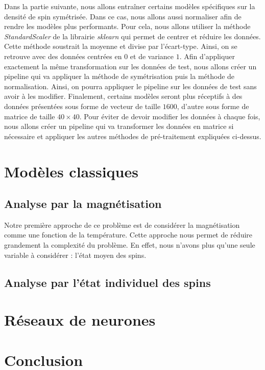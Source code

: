 \documentclass[11pt]{scrartcl} %
\begin{document}
Dans la partie suivante, nous allons entraîner certains modèles spécifiques sur la densité de spin symétrisée. Dans ce cas, nous allons aussi normaliser afin de rendre les modèles plus performants.
Pour cela, nous allons utiliser la méthode \textit{StandardScaler} de la librairie \textit{sklearn} qui permet de centrer et réduire les données. Cette méthode soustrait la moyenne et divise par l'écart-type. Ainsi, on se retrouve avec des données centrées en $0$ et de variance $1$.
Afin d'appliquer exactement la même transformation sur les données de test, nous allons créer un pipeline qui va appliquer la méthode de symétrisation puis la méthode de normalisation. Ainsi, on pourra appliquer le pipeline sur les données de test sans avoir à les modifier.
Finalement, certains modèles seront plus réceptifs à des données présentées sous forme de vecteur de taille $1600$, d'autre sous forme de matrice de taille $40 \times 40$. Pour éviter de devoir modifier les données à chaque fois, nous allons créer un pipeline qui va transformer les données en matrice si nécessaire et appliquer les autres méthodes de pré-traitement expliquées ci-dessus.

\section{Modèles classiques}

\subsection{Analyse par la magnétisation}
Notre première approche de ce problème est de considérer la magnétisation comme une fonction de la température. Cette approche nous permet de réduire grandement la complexité du problème. En effet, nous n'avons plus qu'une seule variable à considérer : l'état moyen des spins.


\subsection{Analyse par l'état individuel des spins}

\section{Réseaux de neurones}

\section*{Conclusion}
\end{document}
